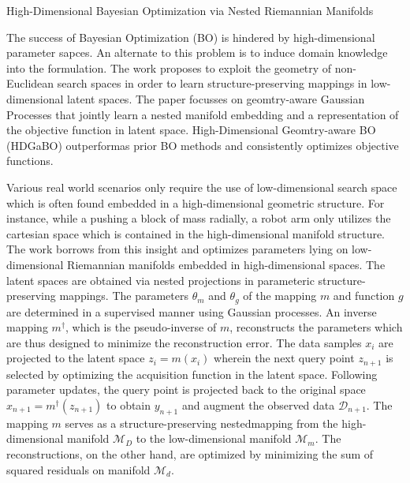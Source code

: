 \documentclass[12pt,letterpaper]{article}
\begin{document}
\begin{center}
  \large{High-Dimensional Bayesian Optimization
  via Nested Riemannian Manifolds}
\end{center}

The success of Bayesian Optimization (BO) is hindered by high-dimensional parameter sapces. An alternate to this problem is to induce domain knowledge into the formulation. The work proposes to exploit the geometry of non-Euclidean search spaces in order to learn structure-preserving mappings in low-dimensional latent spaces. The paper focusses on geomtry-aware Gaussian Processes that jointly learn a nested manifold embedding and a representation of the objective function in latent space. High-Dimensional Geomtry-aware BO (HDGaBO) outperformas prior BO methods and consistently optimizes objective functions.

Various real world scenarios only require the use of low-dimensional search space which is often found embedded in a high-dimensional geometric structure. For instance, while a pushing a block of mass radially, a robot arm only utilizes the cartesian space which is contained in the high-dimensional manifold structure. The work borrows from this insight and optimizes parameters lying on low-dimensional Riemannian manifolds embedded in high-dimensional spaces. The latent spaces are obtained via nested projections in parameteric structure-preserving mappings. The parameters $\theta_{m}$ and $\theta_{g}$ of the mapping $m$ and function $g$ are determined in a supervised manner using Gaussian processes. An inverse mapping $m^{\dag}$, which is the pseudo-inverse of $m$, reconstructs the parameters which are thus designed to minimize the reconstruction error. The data samples $x_{i}$ are projected to the latent space $z_{i} = m(x_{i})$ wherein the next query point $z_{n+1}$ is selected by optimizing the acquisition function in the latent space. Following parameter updates, the query point is projected back to the original space $x_{n+1} = m^{\dag}(z_{n+1})$ to obtain $y_{n+1}$ and augment the observed data $\mathcal{D}_{n+1}$. The mapping $m$ serves as a structure-preserving nestedmapping from the high-dimensional manifold $\mathcal{M}_{D}$ to the low-dimensional manifold $\mathcal{M}_{m}$. The reconstructions, on the other hand, are optimized by minimizing the sum of squared residuals on manifold $\mathcal{M}_{d}$.
\end{document}
